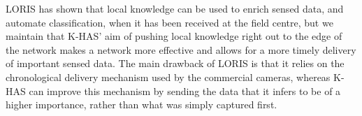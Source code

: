 	LORIS has shown that local knowledge can be used to enrich sensed data, and automate classification, when it has been received at the field centre, but we  maintain that K-HAS' aim of pushing local knowledge right out to the edge of the network makes a network more effective and allows for a more timely delivery of important sensed data.  The main drawback of LORIS is that it relies on the chronological delivery mechanism used by the commercial cameras, whereas K-HAS can improve this mechanism by sending the data that it infers to be of a higher importance, rather than what was simply captured first.

